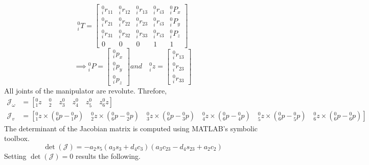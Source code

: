 \begin{equation} \label{eq:Ti0}
    {_i^{0}}T=\begin{bmatrix}
        {_i^{0}}r_{11} & {_i^{0}}r_{12} & {_i^{0}}r_{13} & {_i^{0}}r_{i3} & {_i^{0}}P_x \\
        {_i^{0}}r_{21} & {_i^{0}}r_{22} & {_i^{0}}r_{23} & {_i^{0}}r_{i3} & {_i^{0}}P_y \\
        {_i^{0}}r_{31} & {_i^{0}}r_{32} & {_i^{0}}r_{33} & {_i^{0}}r_{i3} & {_i^{0}}P_z \\
        0              & 0              & 0              & 1              & 1
    \end{bmatrix}
\end{equation}
\begin{equation}
    \implies{_i^{0}}P=\begin{bmatrix}
        {_i^{0}}p_x \\
        {_i^{0}}p_y \\
        {_i^{0}}p_z
    \end{bmatrix}
    and \quad
    {_i^{0}}z=\begin{bmatrix}
        {_i^{0}}r_{13} \\
        {_i^{0}}r_{23} \\
        {_i^{0}}r_{33}
    \end{bmatrix}
\end{equation}
All joints of the manipulator are revolute. Threfore,
\begin{equation}
    \begin{split}
        \mathcal{J_\omega}&=\left[{_1^{0}}z \quad {_2^{0}} \quad z{_3^{0}} \quad z{_4^{0}} \quad z{_5^{0}} \quad z{_6^{0}}z\right]\\
        \mathcal{J}_v&=\left[{_1^{0}}z \times \left({_6^{0}}p-{_1^{0}}p\right) \quad {_2^{0}}z \times \left({_6^{0}}p-{_2^{0}}p\right) \quad
        {_3^{0}}z \times \left({_6^{0}}p-{_3^{0}}p\right) \quad {_4^{0}}z \times \left({_6^{0}}p-{_4^{0}}p\right) \quad
        {_5^{0}}z \times \left({_6^{0}}p-{_5^{0}}p\right) \quad {_6^{0}}z \times \left({_6^{0}}p-{_6^{0}}p\right)\right]
    \end{split}
\end{equation}
The determinant of the Jacobian matrix is computed using MATLAB's symbolic toolbox.
\begin{equation}
    \det\left(\mathcal{J}\right)=-a_2s_5\left(a_3s_3 + d_4c_3\right)\left(a_3c_{23}-d_4s_{23} + a_2c_2\right)
\end{equation}
Setting $\det\left(\mathcal{J}\right)=0$ results the following.
